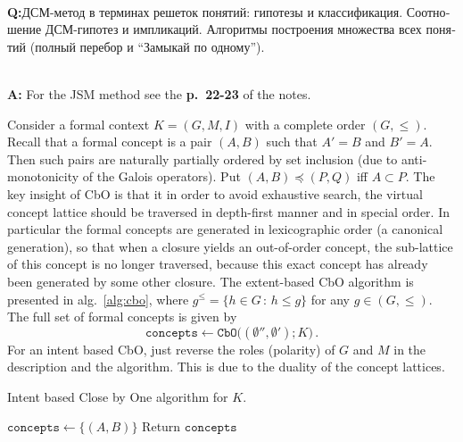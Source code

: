 \documentclass[a4paper]{article}
\newcommand{\rus}[1]{\foreignlanguage{russian}{#1}}
\begin{document}
\hfill\\\textbf{Q:}\rus{ДСМ-метод в терминах решеток понятий: гипотезы и классификация.
Соотношение ДСМ-гипотез и импликаций. Алгоритмы построения множества всех понятий (полный
перебор и ``Замыкай по одному'').}

\hfill\\\textbf{A:}
\noindent For the JSM method see the \textbf{p.~22-23} of the notes.

\noindent Consider a formal context $K=(G, M, I)$ with a complete order
$(G, \leq)$. Recall that a formal concept is a pair $(A, B)$ such that $A'=B$ and
$B'=A$. Then such pairs are naturally partially ordered by set inclusion (due to
anti-monotonicity of the Galois operators). Put $(A, B) \preceq (P, Q)$ iff $A\subset P$.
The key insight of CbO is that it in order to avoid exhaustive search, the virtual
concept lattice should be traversed in depth-first manner and in special order. In
particular the formal concepts are generated in lexicographic order (a canonical
generation), so that when a closure yields an out-of-order concept, the sub-lattice
of this concept is no longer traversed, because this exact concept has already been
generated by some other closure. The extent-based CbO algorithm is presented in
alg.~\ref{alg:cbo}, where $g^\leq = \{h\in G\,:\,h\leq g\}$ for any $g\in (G, \leq)$.
The full set of formal concepts is given by
$$ \mathtt{concepts}
    \leftarrow \mathtt{CbO}\bigl((\emptyset'', \emptyset'); K\bigr)
    \,. $$
For an intent based CbO, just reverse the roles (polarity) of $G$ and $M$ in the
description and the algorithm. This is due to the duality of the concept lattices.
\begin{algorithm}
    \caption{Intent based Close by One algorithm for $K$.}\label{alg:cbo}
    \BlankLine
    $\mathtt{concepts} \leftarrow \{(A, B)\}$\;
    Return $\mathtt{concepts}$\;
\end{algorithm}
\end{document}
